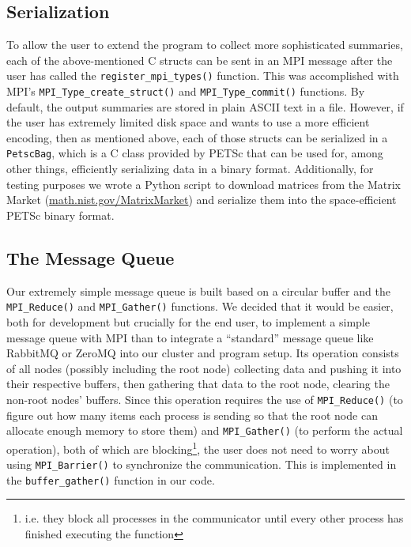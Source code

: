 \subsection*{Serialization}
To allow the user to extend the program to collect more sophisticated summaries, each of the above-mentioned C structs can be sent in an MPI message after the user has called the \lstinline{register_mpi_types()} function. This was accomplished with MPI's \lstinline{MPI_Type_create_struct()} and \lstinline{MPI_Type_commit()} functions. By default, the output summaries are stored in plain ASCII text in a file. However, if the user has extremely limited disk space and wants to use a more efficient encoding, then as mentioned above, each of those structs can be serialized in a \lstinline{PetscBag}, which is a C class provided by PETSc that can be used for, among other things, efficiently serializing data in a binary format. Additionally, for testing purposes we wrote a Python script to download matrices from the Matrix Market (\url{math.nist.gov/MatrixMarket}) and serialize them into the space-efficient PETSc binary format. 
\subsection*{The Message Queue}
Our extremely simple message queue is built based on a circular buffer and the \lstinline{MPI_Reduce()} and \lstinline{MPI_Gather()} functions. We decided that it would be easier, both for development but crucially for the end user, to implement a simple message queue with MPI than to integrate a ``standard'' message queue like RabbitMQ or ZeroMQ into our cluster and program setup. Its operation consists of all nodes (possibly including the root node) collecting data and pushing it into their respective buffers, then gathering that data to the root node, clearing the non-root nodes' buffers. Since this operation requires the use of \lstinline{MPI_Reduce()} (to figure out how many items each process is sending so that the root node can allocate enough memory to store them) and \lstinline{MPI_Gather()} (to perform the actual operation), both of which are blocking\footnote{i.e. they block all processes in the communicator until every other process has finished executing the function}, the user does not need to worry about using \lstinline{MPI_Barrier()} to synchronize the communication. This is implemented in the \lstinline{buffer_gather()} function in our code.

